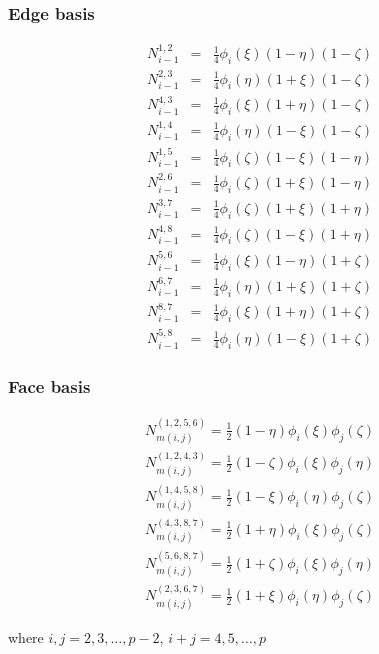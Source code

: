 \subsubsection{Edge basis}
 
\begin{eqnarray*}
N_{i-1}^{1,2}&=&\frac{1}{4}\phi_i(\xi)(1-\eta)(1-\zeta) \\
N_{i-1}^{2,3}&=&\frac{1}{4}\phi_i(\eta)(1+\xi)(1-\zeta) \\
N_{i-1}^{4,3}&=&\frac{1}{4}\phi_i(\xi)(1+\eta)(1-\zeta) \\
N_{i-1}^{1,4}&=&\frac{1}{4}\phi_i(\eta)(1-\xi)(1-\zeta) \\
N_{i-1}^{1,5}&=&\frac{1}{4}\phi_i(\zeta)(1-\xi)(1-\eta) \\
N_{i-1}^{2,6}&=&\frac{1}{4}\phi_i(\zeta)(1+\xi)(1-\eta) \\
N_{i-1}^{3,7}&=&\frac{1}{4}\phi_i(\zeta)(1+\xi)(1+\eta) \\
N_{i-1}^{4,8}&=&\frac{1}{4}\phi_i(\zeta)(1-\xi)(1+\eta) \\
N_{i-1}^{5,6}&=&\frac{1}{4}\phi_i(\xi)(1-\eta)(1+\zeta) \\
N_{i-1}^{6,7}&=&\frac{1}{4}\phi_i(\eta)(1+\xi)(1+\zeta) \\
N_{i-1}^{8,7}&=&\frac{1}{4}\phi_i(\xi)(1+\eta)(1+\zeta) \\
N_{i-1}^{5,8}&=&\frac{1}{4}\phi_i(\eta)(1-\xi)(1+\zeta)
\end{eqnarray*}

\subsubsection{Face basis}

\begin{eqnarray*}
N_{m(i,j)}^{(1,2,5,6)}=\frac{1}{2}(1-\eta)\phi_i(\xi)\phi_j(\zeta) \\
N_{m(i,j)}^{(1,2,4,3)}=\frac{1}{2}(1-\zeta)\phi_i(\xi)\phi_j(\eta) \\
N_{m(i,j)}^{(1,4,5,8)}=\frac{1}{2}(1-\xi)\phi_i(\eta)\phi_j(\zeta) \\
N_{m(i,j)}^{(4,3,8,7)}=\frac{1}{2}(1+\eta)\phi_i(\xi)\phi_j(\zeta) \\
N_{m(i,j)}^{(5,6,8,7)}=\frac{1}{2}(1+\zeta)\phi_i(\xi)\phi_j(\eta) \\
N_{m(i,j)}^{(2,3,6,7)}=\frac{1}{2}(1+\xi)\phi_i(\eta)\phi_j(\zeta)
\end{eqnarray*}

\noindent where $i,j=2,3,\ldots,p-2$, $i+j=4,5,\ldots,p$


